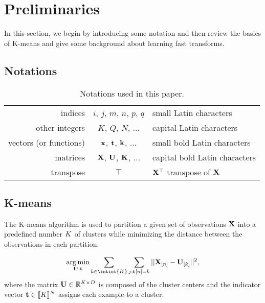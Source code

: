 \section{Preliminaries}
\label{sec:background}

In this section, we begin by introducing some notation and then review the basics of K-means and give some background about learning fast transforms.

\subsection{Notations}




\begin{table}[t]
	\centering
	\begin{tabular}{|r|c|l|}
		\hline
		indices &  $i$, $j$, $m$, $n$, $p$, $q$ &  small  Latin characters  \\
		other integers &  $K$, $Q$, $N$, $\ldots$ &  capital  Latin characters \\
		vectors (or functions) & ${\mathbf{x}}$, ${\mathbf{t}}$, ${\mathbf{k}}$, $\ldots$ & small bold Latin characters \\
		matrices  & ${\mathbf{X}}$, ${\mathbf{U}}$, ${\mathbf{K}}$, $\ldots$ & capital bold Latin characters \\
		transpose & $\top$ & ${\mathbf{X}}^\top$ transpose of  ${\mathbf{X}}$ \\
		\hline
	\end{tabular}
	\caption{Notations used in this paper.}
	\label{tab:notation}
\end{table}
\addtocounter{footnote}{0}






\subsection{K-means}
\label{sec:kmeans}
The K-means algorithm is used to partition a given set of observations ${\mathbf{X}}$ into a predefined number $K$ of clusters while minimizing the distance between the observations in each partition:

\begin{equation}
\label{eq:kmean_problem}
    \argmin_{\rmU, \rvt} \sum_{k\in\intint{\nclusters}} \sum_{j: \rvt[n] = k} ||\rmX_{[n]} -\rmU_{[k]}||^2,
\end{equation}
where the matrix ${\mathbf{U}} \in \mathbb{R}^{K \times D}$ is composed of the cluster centers and the indicator vector ${\mathbf{t}} \in  [\![K]\!]^N$ assigns each example to a cluster.

